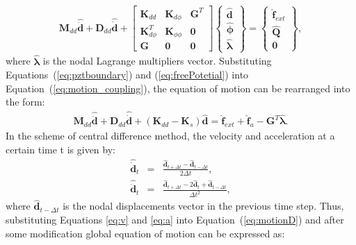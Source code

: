 \begin{eqnarray}
	\label{eq:motion_coupling}
	\textbf{M}_{dd} \widehat{\ddot{\textbf{d}}} +
	\textbf{D}_{dd}	\widehat{\dot{\textbf{d}}} +
	\left [\begin{array}{ccc}
		\textbf{K}_{dd}&\textbf{K}_{d\phi}&\textbf{G}^T\\
		\textbf{K}_{d\phi}^T&\textbf{K}_{\phi \phi}&\textbf{0}\\
		\textbf{G}&\textbf{0}&\textbf{0}
	\end{array}\right]
	\left \{\begin{array}{c}
		\widehat{\textbf{d}}\\
		\widehat{\boldsymbol{\phi}}\\
		\widehat{\boldsymbol{\lambda}}
	\end{array}\right\} =
	\left \{\begin{array}{c}
		\widehat{\textbf{f}}_{ext} \\
		\widehat{\textbf{Q}}\\
		\textbf{0}
	\end{array}\right \},
\end{eqnarray}
where \(\widehat{\boldsymbol{\lambda}}\) is the nodal Lagrange multipliers vector.
Substituting Equations~(\ref{eq:pztboundary}) and (\ref{eq:freePotetial}) into Equation~(\ref{eq:motion_coupling}), the equation of motion can be rearranged into the form:
\begin{eqnarray}
	\textbf{M}_{dd} \widehat{\ddot{\textbf{d}}} + \textbf{D}_{dd} \widehat{\dot{\textbf{d}}} + (\textbf{K}_{dd}-\textbf{K}_{s}) \widehat{\textbf{d}}  = \widehat{\textbf{f}}_{ext} + \widehat{\textbf{f}}_{a} - \textbf{G}^T \widehat{\boldsymbol{\lambda}}.
	\label{eq:motionD}
\end{eqnarray}
In the scheme of central difference method, the velocity and acceleration at a certain time t is given by:
\begin{eqnarray}
	\label{eq:v}
	\widehat{\dot{\textbf{d}}}_{t} & = & \frac{\widehat{\textbf{d}}_{t+\Delta t} - \widehat{\textbf{d}}_{t-\Delta t}}{2\Delta t},\\
	\label{eq:a}
	\widehat{\ddot{\textbf{d}}}_{t} & = & \frac{\widehat{\textbf{d}}_{t+\Delta t} - 2\widehat{\textbf{d}}_{t} + \widehat{\textbf{d}}_{t-\Delta t}}{\Delta t^2},
\end{eqnarray}
where \(\widehat{\textbf{d}}_{t-\Delta t}\) is the nodal displacements vector in the previous time step.
Thus, substituting Equations \ref{eq:v} and \ref{eq:a} into Equation~(\ref{eq:motionD}) and after some modification global equation of motion can be expressed as:
